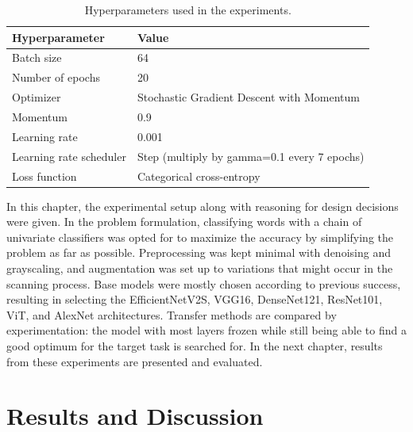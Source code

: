 \documentclass[english,twoside,openright]{UH_DS_MSc}
\begin{document}
\begin{table}[h!]
    \centering
    \caption{Hyperparameters used in the experiments.}
    \begin{tabular}{ll}
    \hline
    \textbf{Hyperparameter} & \textbf{Value} \\ \hline
    Batch size & 64 \\ 
    Number of epochs & 20 \\
    Optimizer & Stochastic Gradient Descent with Momentum \\
    Momentum & 0.9 \\
    Learning rate & 0.001 \\
    Learning rate scheduler & Step (multiply by gamma=0.1 every 7 epochs)\\
    Loss function & Categorical cross-entropy \\ \hline
    \end{tabular}
    \label{table:hyperparameters}
\end{table}

In this chapter, the experimental setup along with reasoning for design decisions were given.
In the problem formulation, classifying words with a chain of univariate classifiers was opted for to 
maximize the accuracy by simplifying the problem as far as possible.
Preprocessing was kept minimal with denoising and grayscaling, 
and augmentation was set up to variations that might occur in the scanning process. Base models were mostly
chosen according to previous success, resulting in selecting the EfficientNetV2S, VGG16, DenseNet121, ResNet101, ViT, and AlexNet architectures.
Transfer methods are compared by experimentation: the model with most layers frozen while still being able to find a good optimum 
for the target task is searched for. In the next chapter, 
results from these experiments are presented and evaluated.

\chapter{Results and Discussion}
\end{document}
